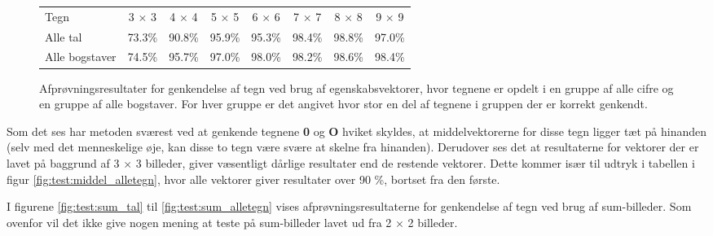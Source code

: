 \begin{figure}[htp]
\centering
\begin{tabular}{|l|c|c|c|c|c|c|c|}\hline
\rowcolor[gray]{0.9} \multicolumn{8}{|>{\columncolor[gray]{0.9}}c|}{\textbf{Genkendelse af tegn - Egenskabsvektor}} \\ \hline
Tegn & 3 $\times$ 3 & 4 $\times$ 4 & 5 $\times$ 5 & 6 $\times$ 6 & 7 $\times$ 7 & 8 $\times$ 8 & 9 $\times$ 9\\\hline
Alle tal & 73.3\% & 90.8\% & 95.9\% & 95.3\% & 98.4\% & 98.8\% & 97.0\%\\\hline
Alle bogstaver & 74.5\% & 95.7\% & 97.0\% & 98.0\% & 98.2\% & 98.6\% & 98.4\%\\\hline
\end{tabular}
\caption{Afprøvningsresultater for genkendelse af tegn ved brug af egenskabsvektorer, hvor tegnene er opdelt i en gruppe af alle cifre og en gruppe af alle bogstaver. For hver gruppe er det angivet hvor stor en del af tegnene i gruppen der er korrekt genkendt.}
\label{fig:test:middel_alletegn}
\end{figure}

Som det ses har metoden sværest ved at genkende tegnene \textbf{0} og \textbf{O} hviket skyldes, at middelvektorerne for disse tegn ligger tæt på hinanden (selv med det menneskelige øje, kan disse to tegn være svære at skelne fra hinanden). Derudover ses det at resultaterne for vektorer der er lavet på baggrund af 3 $\times$ 3 billeder, giver væsentligt dårlige resultater end de restende vektorer. Dette kommer især til udtryk i tabellen i figur \vref{fig:test:middel_alletegn}, hvor alle vektorer giver resultater over 90 \%, bortset fra den første.

I figurene \ref{fig:test:sum_tal} til \ref{fig:test:sum_alletegn} vises afprøvningsresultaterne for genkendelse af tegn ved brug af sum-billeder. Som ovenfor vil det ikke give nogen mening at teste på sum-billeder lavet ud fra 2 $\times$ 2 billeder.

